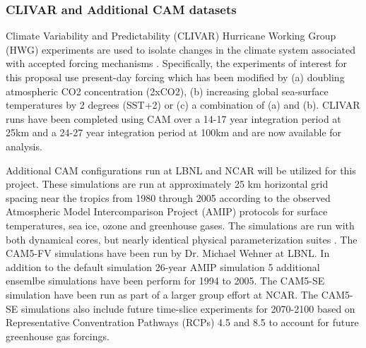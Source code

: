 \documentclass[11pt]{article}
\begin{document}



\subsubsection{CLIVAR and Additional CAM datasets} \label{sec:CLIVAR-IPCC-CMIP5}

Climate Variability and Predictability (CLIVAR) Hurricane Working Group (HWG) experiments are  used to isolate changes in the climate system associated with accepted forcing mechanisms \citep{Walsh2015}.  Specifically, the experiments of interest for this proposal use present-day forcing which has been modified by (a) doubling atmospheric CO2 concentration (2xCO2), (b) increasing global sea-surface temperatures by 2 degrees (SST+2) or (c) a combination of (a) and (b).  CLIVAR runs have been completed using CAM over a 14-17 year integration period at 25km and a 24-27 year integration period at 100km and are now available for analysis.

Additional CAM configurations run at LBNL and NCAR will be utilized for this project. These simulations are run at approximately 25 km horizontal grid spacing near the tropics from 1980 through 2005 according to the observed Atmospheric Model Intercomparison Project (AMIP) protocols \citep{Gates1992,Gates1999} for surface temperatures, sea ice, ozone and greenhouse gases. The simulations are run with both dynamical cores, but nearly identical physical parameterization suites \citep{NCARCAM52012}. The CAM5-FV simulations have been run by Dr. Michael Wehner at LBNL. In addition to the default simulation 26-year AMIP simulation 5 additional ensemlbe simulations have been perform for 1994 to 2005. The CAM5-SE simulation have been run as part of a larger group effort at NCAR. The CAM5-SE simulations also include future time-slice experiments for 2070-2100 based on Representative Conventration Pathways (RCPs) 4.5 and 8.5 to account for future greenhouse gas forcings. 
\end{document}
